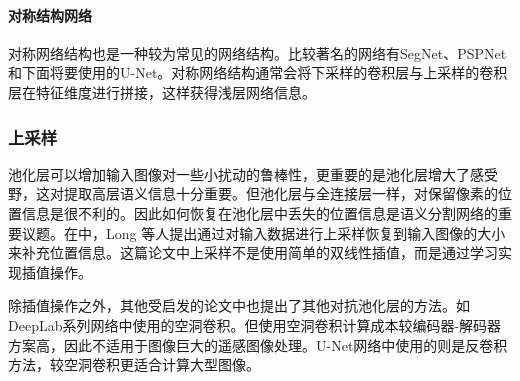\paragraph{对称结构网络}
对称网络结构也是一种较为常见的网络结构。比较著名的网络有SegNet\cite{badrinarayanan2017segnet}、PSPNet\cite{zhao2017pyramid}和下面将要使用的U-Net\cite{ronneberger2015u}。对称网络结构通常会将下采样的卷积层与上采样的卷积层在特征维度进行拼接，这样获得浅层网络信息。

\subsubsection{上采样}
池化层可以增加输入图像对一些小扰动的鲁棒性，更重要的是池化层增大了感受野，这对提取高层语义信息十分重要。但池化层与全连接层一样，对保留像素的位置信息是很不利的。因此如何恢复在池化层中丢失的位置信息是语义分割网络的重要议题。在\cite{long2015fully}中，Long 等人提出通过对输入数据进行上采样恢复到输入图像的大小来补充位置信息。这篇论文中上采样不是使用简单的双线性插值，而是通过学习实现插值操作。

除插值操作之外，其他受\cite{long2015fully}启发的论文中也提出了其他对抗池化层的方法。如DeepLab\cite{chen2014semantic}系列网络中使用的空洞卷积。但使用空洞卷积计算成本较编码器-解码器方案高，因此不适用于图像巨大的遥感图像处理。U-Net网络中使用的则是反卷积方法，较空洞卷积更适合计算大型图像。




